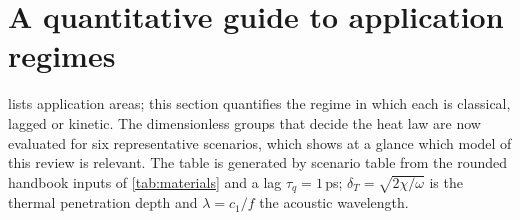 \section{A quantitative guide to application regimes}\label{sec:scenarios}

 lists application areas; this section quantifies the regime in which each is classical, lagged or kinetic. The dimensionless groups that decide the heat law are now evaluated for six representative scenarios, which shows at a glance which model of this review is relevant. The table is generated by scenario table from the rounded handbook inputs of \cref{tab:materials} and a lag $\tau_q=1$\,ps; $\delta_T=\sqrt{2\chi/\omega}$ is the thermal penetration depth and $\lambda=c_1/f$ the acoustic wavelength.

\begin{table}[ht]\centering\scriptsize
\caption{Dimensionless groups for six scenarios ($T_0=300$\,K, $\tau_q=1$\,ps). The assessment column applies the rule: Fourier is adequate if $\omega\tau_q<0.1$ and $\omega/\omega_*<0.1$; a lag law may matter if $\omega\tau_q<1.5$ but then the kinetic validity of the model must be checked; otherwise the continuum heat law itself is questionable.}\label{tab:scenarios}

\end{table}

